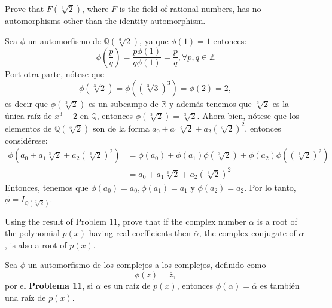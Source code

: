 \begin{problema}[Problema 12]
    Prove that $F(\sqrt[3]{2})$, where $F$ is the field of rational numbers, has no automorphisms other than the identity automorphism.
    \begin{dem}
        Sea $\phi$ un automorfismo de $\mathbb{Q}(\sqrt[3]{2})$, ya que $\phi(1)=1$ entonces:
        $$\phi\left(\frac{p}{q}\right)=\frac{p\phi(1)}{q\phi(1)}=\frac{p}{q},\forall p,q\in \mathbb{Z}$$
        Port otra parte, nótese que 
        $$\phi(\sqrt[3]{2})=\phi((\sqrt[3]{3})^3)=\phi(2)=2,$$
        es decir que $\phi(\sqrt[3]{2})$ es un subcampo de $\mathbb{R}$ y además tenemos que $\sqrt[3]{2}$ es la única raíz de $x^3-2$ en $\mathbb{Q}$, entonces $\phi(\sqrt[3]{2})=\sqrt[3]{2}$. Ahora bien, nótese que los elementos de $\mathbb{Q}(\sqrt[3]{2})$ son de la forma $a_0+a_1\sqrt[3]{2}+a_2(\sqrt[3]{2})^2$, entonces considérese: 
        \begin{align*}
            \phi\left(a_0+a_1\sqrt[3]{2}+a_2(\sqrt[3]{2})^2 \right) &= \phi(a_0)+\phi(a_1)\phi(\sqrt[3]{2})+\phi(a_2)\phi((\sqrt[3]{2})^2)\\
            &= a_0+a_1\sqrt[3]{2}+a_2(\sqrt[3]{2})^2
        \end{align*}
        Entonces, tenemos que $\phi(a_0)=a_0,\phi(a_1)=a_1$ y $\phi(a_2)=a_2$. Por lo tanto, $\phi=I_{\mathbb{Q}(\sqrt[3]{2})}$.
    \end{dem}
\end{problema}

\begin{problema}[Problema 13]
    Using the result of Problem 11, prove that if the complex number $\alpha$ is a root of the polynomial $p(x)$ having real coefficients then $\bar{\alpha}$, the complex conjugate of $\alpha$, is also a root of $p(x)$.
    \begin{dem}
        Sea $\phi$ un automorfismo de los complejos a los complejos, definido como 
        $$\phi(z)=\overline{z},$$
        por el \textbf{Problema 11}, si $\alpha$ es un raíz de $p(x)$, entonces $\phi(\alpha)=\overline{\alpha}$ es también una raíz de $p(x)$. 
    \end{dem}
\end{problema}

%
%

